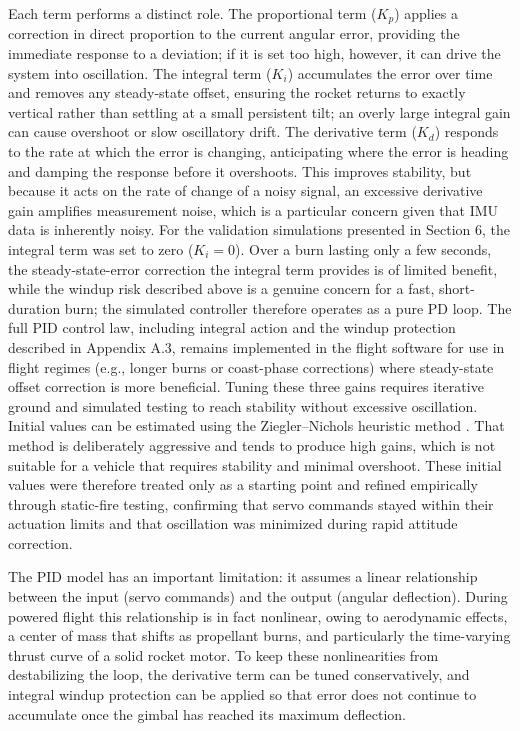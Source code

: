 Each term performs a distinct role. The proportional term ($K_p$) applies a correction in direct proportion to the current angular error, providing the immediate response to a deviation; if it is set too high, however, it can drive the system into oscillation. The integral term ($K_i$) accumulates the error over time and removes any steady-state offset, ensuring the rocket returns to exactly vertical rather than settling at a small persistent tilt; an overly large integral gain can cause overshoot or slow oscillatory drift. The derivative term ($K_d$) responds to the rate at which the error is changing, anticipating where the error is heading and damping the response before it overshoots. This improves stability, but because it acts on the rate of change of a noisy signal, an excessive derivative gain amplifies measurement noise, which is a particular concern given that IMU data is inherently noisy.
For the validation simulations presented in Section 6, the integral term was set to zero ($K_i = 0$). Over a burn lasting only a few seconds, the steady-state-error correction the integral term provides is of limited benefit, while the windup risk described above is a genuine concern for a fast, short-duration burn; the simulated controller therefore operates as a pure PD loop. The full PID control law, including integral action and the windup protection described in Appendix A.3, remains implemented in the flight software for use in flight regimes (e.g., longer burns or coast-phase corrections) where steady-state offset correction is more beneficial.
Tuning these three gains requires iterative ground and simulated testing to reach stability without excessive oscillation. Initial values can be estimated using the Ziegler--Nichols heuristic method \cite{ziegler1942}. That method is deliberately aggressive and tends to produce high gains, which is not suitable for a vehicle that requires stability and minimal overshoot. These initial values were therefore treated only as a starting point and refined empirically through static-fire testing, confirming that servo commands stayed within their actuation limits and that oscillation was minimized during rapid attitude correction.

The PID model has an important limitation: it assumes a linear relationship between the input (servo commands) and the output (angular deflection). During powered flight this relationship is in fact nonlinear, owing to aerodynamic effects, a center of mass that shifts as propellant burns, and particularly the time-varying thrust curve of a solid rocket motor. To keep these nonlinearities from destabilizing the loop, the derivative term can be tuned conservatively, and integral windup protection can be applied so that error does not continue to accumulate once the gimbal has reached its maximum deflection.




